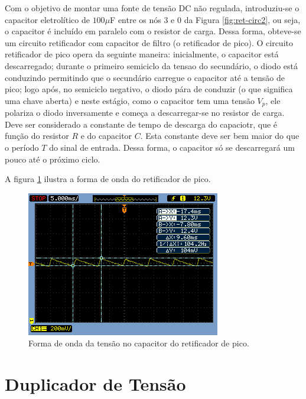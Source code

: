 \documentclass[a4paper]{article} %
\renewcommand{\thefigure}{\thesection.\arabic{figure}}
\begin{document}
\newpage
    Com o objetivo de montar uma fonte de tensão DC não regulada, introduziu-se o capacitor eletrolítico de  $100\mu$F entre os nós 3 e 0 da Figura \ref{fig:ret-circ2}, ou seja, o capacitor é incluído em paralelo com o resistor de carga. Dessa forma, obteve-se um circuito retificador com capacitor de filtro (o retificador de pico).
         O circuito retificador de pico opera da seguinte maneira: inicialmente, o capacitor está descarregado; durante o primeiro semiciclo da tensao do secundário, o diodo está conduzindo permitindo que o secundário carregue o capacitor até a tensão de pico; logo após, no semiciclo negativo, o diodo pára de conduzir (o que significa uma chave aberta) e neste estágio, como o capacitor tem uma tensão $V_p$, ele polariza o diodo inversamente e começa a descarregar-se no resistor de carga. Deve ser considerado a constante de tempo de descarga do capaciotr, que é função do resistor $R$ e do capacitor $C$. Esta constante deve ser bem maior do que o período $T$ do sinal de entrada. Dessa forma, o capacitor só se descarregará um pouco até o próximo ciclo.

A figura \ref{fig:cap-ret} ilustra a forma de onda do retificador de pico.

\begin{figure}[h!]
\begin{centering}
\includegraphics[scale=0.7]{Imagens/3.3.4capacitor_paralelo/3cap} \caption{Forma de onda da tensão no capacitor do retificador de pico. \label{fig:cap-ret}}
\par\end{centering}
\end{figure}

\newpage

\renewcommand{\thefigure}{\thesection.\arabic{figure}}

\section{Duplicador de Tensão}
\end{document}
